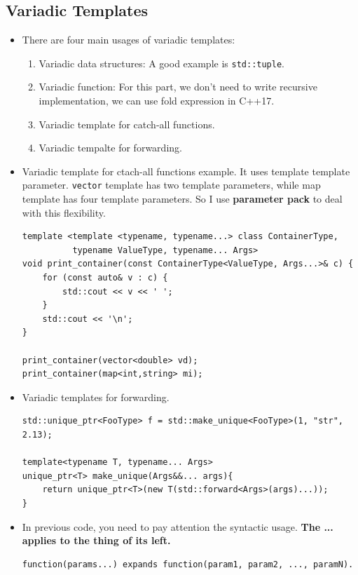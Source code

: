 \documentclass[a4paper,11pt,twoside]{book}
\begin{document}
\subsection{Variadic Templates}
\begin{itemize}
    \item There are four main usages of variadic templates:
        \begin{enumerate}
            \item Variadic data structures: A good example is \texttt{std::tuple}.
            \item Variadic function: For this part, we don't need to write recursive implementation, we can use fold expression in C++17.
            \item Variadic template for catch-all functions. 
            \item Variadic tempalte for forwarding.
        \end{enumerate}

    \item Variadic template for ctach-all functions example. It uses template template parameter. \texttt{vector} template has two template parameters, while map template has four template parameters. So I use \textbf{parameter pack} to deal with this flexibility.

\begin{lstlisting}
template <template <typename, typename...> class ContainerType,
          typename ValueType, typename... Args>
void print_container(const ContainerType<ValueType, Args...>& c) {
    for (const auto& v : c) {
        std::cout << v << ' ';
    }
    std::cout << '\n';
}

print_container(vector<double> vd);
print_container(map<int,string> mi);
\end{lstlisting}

    \item Variadic templates for forwarding. 
\begin{lstlisting}
std::unique_ptr<FooType> f = std::make_unique<FooType>(1, "str", 2.13);

template<typename T, typename... Args>
unique_ptr<T> make_unique(Args&&... args){
	return unique_ptr<T>(new T(std::forward<Args>(args)...));
}
\end{lstlisting}

    \item In previous code, you need to pay attention the syntactic usage. \textbf{The ... applies to the thing of its left.}
\begin{lstlisting}
function(params...) expands function(param1, param2, ..., paramN).


\end{lstlisting}
\end{itemize}
\end{document}
